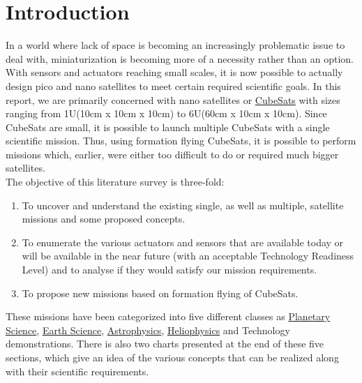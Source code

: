 \section{Introduction}
In a world where lack of space is becoming an increasingly problematic issue to deal with, miniaturization is becoming more of  a necessity rather than an option. With sensors and actuators reaching small scales, it is now possible to actually design pico and nano satellites to meet certain required scientific goals. In this report, we are primarily concerned with nano satellites or \href{http://www.cubesat.org/images/developers/cds_rev12.pdf}{CubeSats} with sizes ranging from 1U(10cm x 10cm x 10cm) to 6U(60cm x 10cm x 10cm). Since CubeSats are small, it is possible to launch multiple CubeSats with a single scientific mission. Thus, using formation flying CubeSats, it is possible to perform missions which, earlier, were either too difficult to do or required much bigger satellites. \\

The objective of this literature survey is three-fold: 
\begin{enumerate}
\item To uncover and understand the existing single, as well as multiple, satellite missions and some proposed concepts.
\item To enumerate the various actuators and sensors that are available today or will be available in the near future (with an acceptable Technology Readiness Level) and to analyse if they would satisfy our mission requirements. 
\item To propose new missions based on formation flying of CubeSats.
\end{enumerate}


These missions have been categorized into five different classes as \href{http://solarsystem.nasa.gov/multimedia/download-detail.cfm?DL_ID=742}{Planetary Science}, \href{http://www.nap.edu/catalog.php?record_id=11820}{Earth Science}, \href{http://www.nap.edu/catalog.php?record_id=12951}{Astrophysics}, \href{http://www.nap.edu/catalog.php?record_id=13060}{Heliophysics} and Technology demonstrations. There is also two charts presented at the end of these five sections, which give an idea of the various concepts that can be realized along with their scientific requirements. 
